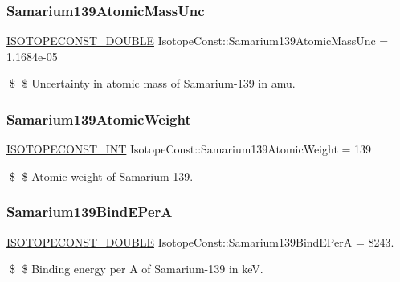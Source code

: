 \subsubsection{\texorpdfstring{Samarium139\+Atomic\+Mass\+Unc}{Samarium139AtomicMassUnc}}
{\footnotesize\ttfamily \mbox{\hyperlink{group___isotope_const-_macros_ga8f45a7272ce02c0b4c65c44636ed719a}{I\+S\+O\+T\+O\+P\+E\+C\+O\+N\+S\+T\+\_\+\+D\+O\+U\+B\+LE}} Isotope\+Const\+::\+Samarium139\+Atomic\+Mass\+Unc = 1.\+1684e-\/05}

\$ \$ Uncertainty in atomic mass of Samarium-\/139 in amu. \mbox{\label{group___isotope_const-_samarium-_sm139_gac2e6acd9587fff3cb66e34e433f93ee9}} 
\subsubsection{\texorpdfstring{Samarium139\+Atomic\+Weight}{Samarium139AtomicWeight}}
{\footnotesize\ttfamily \mbox{\hyperlink{group___isotope_const-_macros_ga5f18360b3e99483a35c32d789e62621c}{I\+S\+O\+T\+O\+P\+E\+C\+O\+N\+S\+T\+\_\+\+I\+NT}} Isotope\+Const\+::\+Samarium139\+Atomic\+Weight = 139}

\$ \$ Atomic weight of Samarium-\/139. \mbox{\label{group___isotope_const-_samarium-_sm139_gaa087f9537adb05db2b60a4160c28f02b}} 
\subsubsection{\texorpdfstring{Samarium139\+Bind\+E\+PerA}{Samarium139BindEPerA}}
{\footnotesize\ttfamily \mbox{\hyperlink{group___isotope_const-_macros_ga8f45a7272ce02c0b4c65c44636ed719a}{I\+S\+O\+T\+O\+P\+E\+C\+O\+N\+S\+T\+\_\+\+D\+O\+U\+B\+LE}} Isotope\+Const\+::\+Samarium139\+Bind\+E\+PerA = 8243.}

\$ \$ Binding energy per A of Samarium-\/139 in keV. \mbox{\label{group___isotope_const-_samarium-_sm139_gaa7116a8a73ff18141a5881150bd939eb}} 
